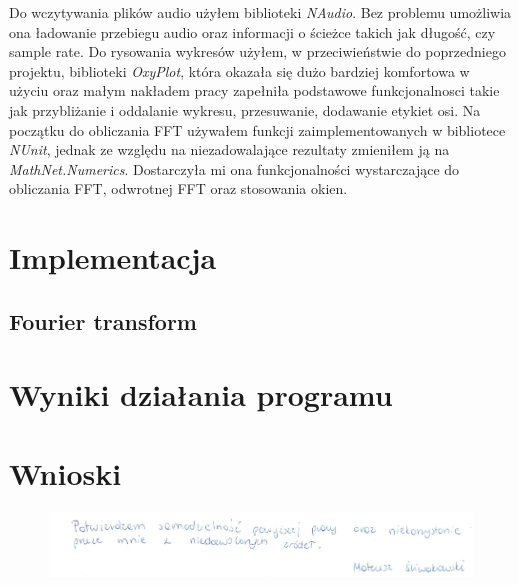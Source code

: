 \documentclass{article}
\begin{document}
Do wczytywania plików audio użyłem biblioteki \textit{NAudio}. Bez problemu umożliwia ona ładowanie przebiegu audio oraz informacji o ścieżce takich jak długość, czy sample rate. Do rysowania wykresów użyłem, w przeciwieństwie do poprzedniego projektu, biblioteki \textit{OxyPlot}, która okazała się dużo bardziej komfortowa w użyciu oraz małym nakładem pracy zapełniła podstawowe funkcjonalnosci takie jak przybliżanie i oddalanie wykresu, przesuwanie, dodawanie etykiet osi. Na początku do obliczania FFT używałem funkcji zaimplementowanych w bibliotece \textit{NUnit}, jednak ze względu na niezadowalające rezultaty zmieniłem ją na \textit{MathNet.Numerics}. Dostarczyła mi ona funkcjonalności wystarczające do obliczania FFT, odwrotnej FFT oraz stosowania okien.

\section{Implementacja}
\subsection{Fourier transform}

\section{Wyniki działania programu}

\section{Wnioski}

\begin{figure}[b]
\centering
\includegraphics[width=5in]{bottom.png}
\end{figure}
\end{document}
